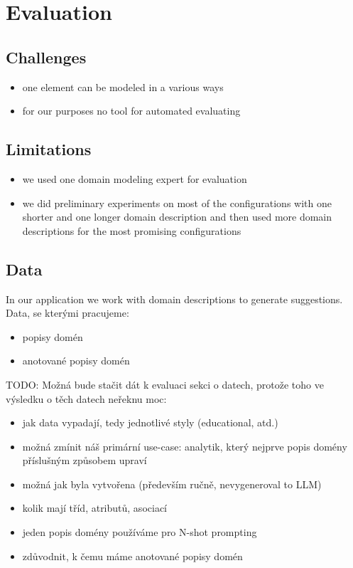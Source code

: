 \chapter{Evaluation}

\section{Challenges}
\begin{itemize}
\item one element can be modeled in a various ways
\item for our purposes no tool for automated evaluating
\end{itemize}


\section{Limitations}
\begin{itemize}
\item we used one domain modeling expert for evaluation
\item we did preliminary experiments on most of the configurations with one shorter and one longer domain description and then used more domain descriptions for the most promising configurations
\end{itemize}


\section{Data}

In our application we work with domain descriptions to generate suggestions. \\

Data, se kterými pracujeme:
\begin{itemize}
\item popisy domén
\item anotované popisy domén
\end{itemize}


TODO: Možná bude stačit dát k evaluaci sekci o datech, protože toho ve výsledku o těch datech neřeknu moc:
\begin{itemize}
\item jak data vypadají, tedy jednotlivé styly (educational, atd.)
\item možná zmínit náš primární use-case: analytik, který nejprve popis domény příslušným způsobem upraví
\item možná jak byla vytvořena (především ručně, nevygeneroval to LLM)
\item kolik mají tříd, atributů, asociací
\item jeden popis domény používáme pro N-shot prompting
\item zdůvodnit, k čemu máme anotované popisy domén
\end{itemize}



